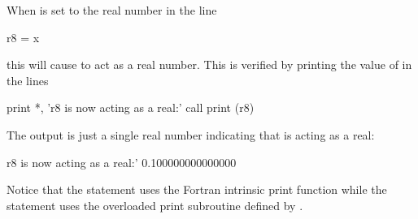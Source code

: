 \documentclass[english,12pt,article]{article} %
\begin{document}
When  is set to the real number  in the line
\begin{example}
    r8 = x
\end{example}
this will cause  to act as a real number. This is verified by printing the value of  in the lines
\begin{example}
  print *, 'r8 is now acting as a real:'
  call print (r8)
\end{example}
The output is just a single real number indicating that  is acting as a real:
\begin{example}
  r8 is now acting as a real:'
  0.100000000000000
\end{example}
Notice that the  statement uses the Fortran intrinsic print function while the  statement uses the overloaded print subroutine defined by .
\end{document}
